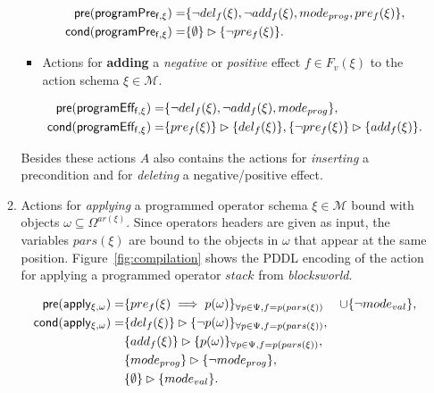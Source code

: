 \documentclass[letterpaper]{article} %
\newcommand{\pre}{\mathsf{pre}}     %
\newcommand{\cond}{\mathsf{cond}}   %
\begin{document}
\begin{itemize}
\begin{enumerate}
\begin{itemize}
\begin{small}
\begin{align*}
\hspace*{7pt}\pre(\mathsf{programPre_{f,\xi}})=&\{\neg del_{f}(\xi),\neg add_{f}(\xi), mode_{prog}, pre_{f}(\xi)\},\\
\cond(\mathsf{programPre_{f,\xi}})=&\{\emptyset\}\rhd\{\neg pre_{f}(\xi)\}.
\end{align*}
\end{small}

\item Actions for {\bf adding} a {\em negative} or {\em positive} effect $f\in F_v(\xi)$ to the action schema $\xi\in\mathcal{M}$.

\begin{small}
\begin{align*}
\hspace*{7pt}\pre(\mathsf{programEff_{f,\xi}})=&\{\neg del_{f}(\xi),\neg add_{f}(\xi), mode_{prog}\},\\
\cond(\mathsf{programEff_{f,\xi}})=&\{pre_{f}(\xi)\}\rhd\{del_{f}(\xi)\},\{\neg pre_{f}(\xi)\}\rhd\{add_{f}(\xi)\}.
\end{align*}
\end{small}
\end{itemize}
Besides these actions $A$ also contains the actions for {\em inserting} a precondition and for {\em deleting} a negative/positive effect.


\item Actions for {\em applying} a programmed operator schema $\xi\in\mathcal{M}$ bound with objects $\omega\subseteq\Omega^{ar(\xi)}$. Since operators headers are given as input, the variables $pars(\xi)$ are bound to the objects in $\omega$ that appear at the same position. Figure~\ref{fig:compilation} shows the PDDL encoding of the action for applying a programmed operator $stack$ from {\em blocksworld}.
\begin{small}
\begin{align*}
\hspace*{7pt}\pre(\mathsf{apply_{\xi,\omega}})=&\{pre_{f}(\xi)\implies p(\omega)\}_{\forall p\in\Psi,f=p(pars(\xi))}
&\cup \{\neg mode_{val}\},\\
\cond(\mathsf{apply_{\xi,\omega}})=&\{del_{f}(\xi)\}\rhd\{\neg p(\omega)\}_{\forall p\in\Psi,f=p(pars(\xi))},\\
&\{add_{f}(\xi)\}\rhd\{p(\omega)\}_{\forall p\in\Psi,f=p(pars(\xi))},\\
&\{mode_{prog}\}\rhd\{\neg mode_{prog}\},\\
&\{\emptyset\}\rhd\{mode_{val}\}.
\end{align*}
\end{small}


\end{enumerate}
\end{itemize}
\end{document}
